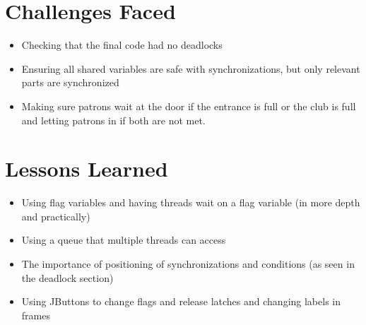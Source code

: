 \documentclass{assignment}
\begin{document}
\section{Challenges Faced}
\begin{itemize}
    \item Checking that the final code had no deadlocks
    \item Ensuring all shared variables are safe with synchronizations, but only relevant parts are synchronized
    \item Making sure patrons wait at the door if the entrance is full or the club is full and letting patrons in if both are not met. 
\end{itemize}

\section{Lessons Learned}
\begin{itemize}
    \item Using flag variables and having threads wait on a flag variable (in more depth and practically)
    \item Using a queue that multiple threads can access
    \item The importance of positioning of synchronizations and conditions (as seen in the deadlock section)
    \item Using JButtons to change flags and release latches and changing labels in frames
\end{itemize}
\end{document}
